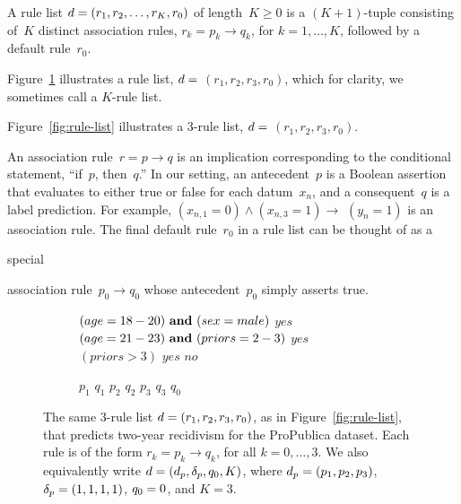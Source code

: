 A rule list ${{d} = (r_1, r_2, \dots, r_K, r_0)}$ of length~${K \ge 0}$
is a ${(K+1)}$-tuple consisting of~$K$ distinct association rules,
${r_k = p_k \rightarrow q_k}$, for ${k = 1, \dots, K}$,
followed by a default rule~$r_0$.
%
\begin{arxiv}
Figure~\ref{fig:rule-list-symbols} illustrates
a rule list, ${{d} =}$ ${(r_1, r_2, r_3, r_0)}$,
which for clarity, we sometimes call a $K$-rule list.
\end{arxiv}
\begin{kdd}
Figure~\ref{fig:rule-list} illustrates a 3-rule list,
${{d} =}$ ${(r_1, r_2, r_3, r_0)}$.
\end{kdd}
%
An association rule~${r = p \rightarrow q}$ is an implication
corresponding to the conditional statement, ``if~$p$, then~$q$.''
%
In our setting, an antecedent~$p$ is a Boolean assertion that
evaluates to either true or false for each datum~$x_n$,
and a consequent~$q$ is a label prediction.
%
For example, ${(x_{n, 1} = 0) \wedge (x_{n, 3} = 1) \rightarrow}$ ${(y_n = 1)}$
is an association rule.
%
%
The final default rule~$r_0$ in a rule list can be thought of
as a
\begin{arxiv}
special
\end{arxiv}
association rule~${p_0 \rightarrow q_0}$
whose antecedent~$p_0$ simply asserts true.

\begin{arxiv}
\begin{figure}[t!]
\begin{subfigure}{0.67\textwidth}
\begin{algorithmic}
\State \bif $(age=18-20) {\bf ~and~} (sex=male)$ \bthen $yes$
\State \belif $(age=21-23)	 {\bf ~and~} (priors=2-3)$ \bthen $yes$
\State \belif $(priors>3)$ \bthen $yes$
\State \belse $no$
\end{algorithmic}
\end{subfigure}
\hfill
\begin{subfigure}{0.32\textwidth}
\begin{algorithmic}
\State \bif $p_1$ \bthen $q_1$
\State \belif $p_2$ \bthen $q_2$
\State \belif $p_3$ \bthen $q_3$
\State \belse $q_0$
\end{algorithmic}
\end{subfigure}
\caption{The same 3-rule list ${{d} = (r_1, r_2, r_3, r_0)}$,
as in Figure~\ref{fig:rule-list},
that predicts two-year recidivism for the ProPublica dataset.
Each rule is of the form ${r_k = p_k \rightarrow q_k}$,
for all ${k = 0, \dots, 3}$.
We also equivalently write ${{d} = (d_p, \delta_p, q_0, K)}$,
where ${d_p = (p_1, p_2, p_3)}$, ${\delta_p = (1, 1, 1, 1)}$,
${q_0 = 0}$, and ${K=3}$.
}
\label{fig:rule-list-symbols}
\end{figure}
\end{arxiv}

